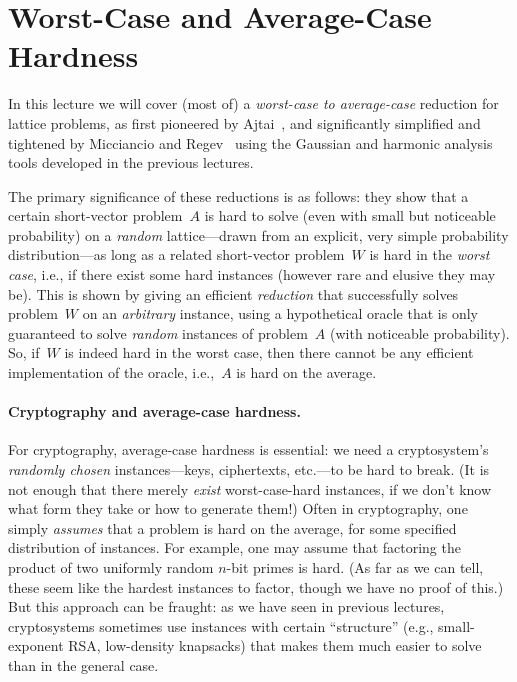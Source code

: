 \documentclass[11pt]{article}
\begin{document}
\thispagestyle{fancy}           %


\section{Worst-Case and Average-Case Hardness}
\label{sec:worst-average}

In this lecture we will cover (most of) a \emph{worst-case to
  average-case} reduction for lattice problems, as first pioneered by
Ajtai~\cite{ajtai04:_gener_hard_instan_lattic_probl}, and
significantly simplified and tightened by Micciancio and
Regev~\cite{DBLP:journals/siamcomp/MicciancioR07} using the Gaussian
and harmonic analysis tools developed in the previous lectures.

The primary significance of these reductions is as follows: they show
that a certain short-vector problem~$A$ is hard to solve (even with
small but noticeable probability) on a \emph{random} lattice---drawn
from an explicit, very simple probability distribution---as long as a
related short-vector problem~$W$ is hard in the \emph{worst case},
i.e., if there exist some hard instances (however rare and elusive
they may be). This is shown by giving an efficient \emph{reduction}
that successfully solves problem~$W$ on an \emph{arbitrary} instance,
using a hypothetical oracle that is only guaranteed to solve
\emph{random} instances of problem~$A$ (with noticeable probability).
So, if~$W$ is indeed hard in the worst case, then there cannot be any
efficient implementation of the oracle, i.e.,~$A$ is hard on the
average.

\paragraph{Cryptography and average-case hardness.}

For cryptography, average-case hardness is essential: we need a
cryptosystem's \emph{randomly chosen} instances---keys, ciphertexts,
etc.---to be hard to break. (It is not enough that there merely
\emph{exist} worst-case-hard instances, if we don't know what form
they take or how to generate them!) Often in cryptography, one simply
\emph{assumes} that a problem is hard on the average, for some
specified distribution of instances. For example, one may assume that
factoring the product of two uniformly random $n$-bit primes is hard.
(As far as we can tell, these seem like the hardest instances to
factor, though we have no proof of this.) But this approach can be
fraught: as we have seen in previous lectures, cryptosystems sometimes
use instances with certain ``structure'' (e.g., small-exponent RSA,
low-density knapsacks) that makes them much easier to solve than in
the general case.
\end{document}
